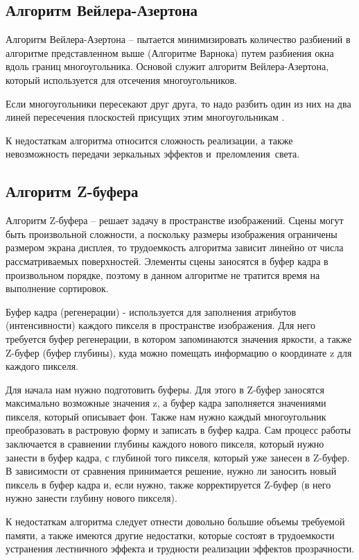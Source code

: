 \subsection{Алгоритм Вейлера-Азертона}

Алгоритм Вейлера-Азертона -- пытается минимизировать количество разбиений в алгоритме представленном выше (Алгоритме Варнока) путем разбиения окна вдоль границ многоугольника. Основой служит алгоритм Вейлера-Азертона, который используется для отсечения многоугольников.

Если многоугольники пересекают друг друга, то надо разбить один из них на два линей пересечения плоскостей присущих этим многоугольникам \cite{tr2}.

К недостаткам алгоритма относится сложность реализации, а также невозможность передачи зеркальных эффектов и преломления света.

\subsection{Алгоритм Z-буфера}

Алгоритм Z-буфера -- решает задачу в пространстве изображений. Сцены могут быть произвольной сложности, а поскольку размеры изображения ограничены размером экрана дисплея, то трудоемкость алгоритма зависит линейно от числа рассматриваемых поверхностей. Элементы сцены заносятся в буфер кадра в произвольном порядке, поэтому в данном алгоритме не тратится время на выполнение сортировок.

Буфер кадра (регенерации) - используется для заполнения атрибутов (интенсивности) каждого пикселя в пространстве изображения. Для него требуется буфер регенерации, в котором запоминаются значения яркости, а также Z-буфер (буфер глубины), куда можно помещать информацию о координате z для каждого пикселя.

Для начала нам нужно подготовить буферы. Для этого в Z-буфер заносятся максимально возможные значения z, а буфер кадра заполняется значениями пикселя, который описывает фон. Также нам нужно каждый многоугольник преобразовать в растровую форму и записать в буфер кадра. Сам процесс работы заключается в сравнении глубины каждого нового пикселя, который нужно занести в буфер кадра, с глубиной того пикселя, который уже занесен в Z-буфер. В зависимости от сравнения принимается решение, нужно ли заносить новый пиксель в буфер кадра и, если нужно, также корректируется Z-буфер (в него нужно занести глубину нового пикселя).

К недостаткам алгоритма следует отнести довольно большие объемы требуемой памяти, а также имеются другие недостатки, которые состоят в трудоемкости устранения лестничного эффекта и трудности реализации эффектов прозрачности.

